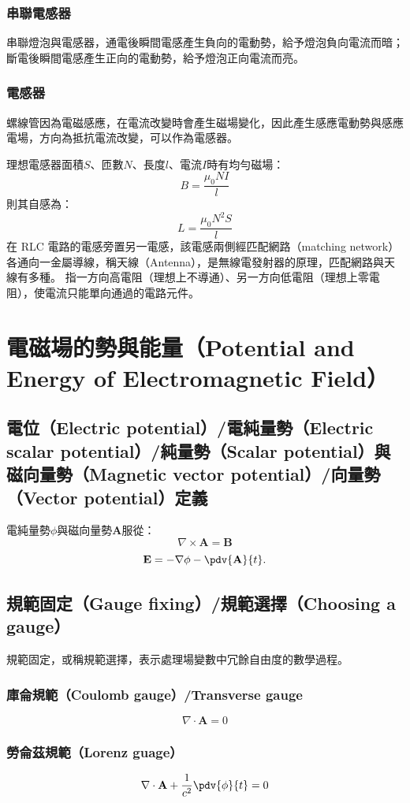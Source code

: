 \documentclass[a4paper,12pt]{report}
\begin{document}
\begin{itemize}
\subsubsection{串聯電感器}
串聯燈泡與電感器，通電後瞬間電感產生負向的電動勢，給予燈泡負向電流而暗；斷電後瞬間電感產生正向的電動勢，給予燈泡正向電流而亮。
\subsubsection{電感器}
螺線管因為電磁感應，在電流改變時會產生磁場變化，因此產生感應電動勢與感應電場，方向為抵抗電流改變，可以作為電感器。

理想電感器面積$S$、匝數$N$、長度$l$、電流$I$時有均勻磁場：
\[B=\frac{\mu_0NI}{l}\]
則其自感為：
\[L=\frac{\mu_0N^2S}{l}\]
在 RLC 電路的電感旁置另一電感，該電感兩側經匹配網路（matching network）各通向一金屬導線，稱天線（Antenna），是無線電發射器的原理，匹配網路與天線有多種。
指一方向高電阻（理想上不導通）、另一方向低電阻（理想上零電阻），使電流只能單向通過的電路元件。


\section{電磁場的勢與能量（Potential and Energy of Electromagnetic Field）}
\subsection{電位（Electric potential）/電純量勢（Electric scalar potential）/純量勢（Scalar potential）與磁向量勢（Magnetic vector potential）/向量勢（Vector potential）定義}
電純量勢$\phi$與磁向量勢$\mathbf{A}$服從：
\[ \nabla \times \mathbf{A} = \mathbf{B}\]
\[\mathbf{E} = - \nabla \phi - \pdv{\mathbf{A} }{t}.\]
\subsection{規範固定（Gauge fixing）/規範選擇（Choosing a gauge）}
規範固定，或稱規範選擇，表示處理場變數中冗餘自由度的數學過程。
\subsubsection{庫侖規範（Coulomb gauge）/Transverse gauge}
\[ \nabla \cdot \mathbf{A} = 0\]
\subsubsection{勞侖茲規範（Lorenz guage）}
\[\nabla \cdot \mathbf{A} + \frac{1}{c^2} \pdv{\phi}{t} = 0\]

\end{itemize}
\end{document}
